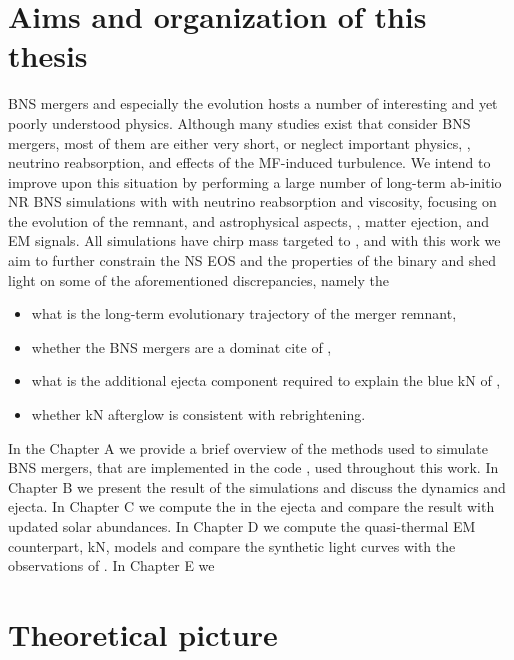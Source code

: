\section{Aims and organization of this thesis}

\ac{BNS} mergers and especially the \pmerg{} evolution hosts a number of interesting 
and yet poorly understood physics. Although many studies exist that consider \ac{BNS} mergers, 
most of them are either very short, or neglect important physics, \eg, neutrino reabsorption, 
and effects of the \ac{MF}-induced turbulence. 
%
We intend to improve upon this situation by performing a large number of long-term ab-initio 
\ac{NR} \ac{BNS} simulations with with neutrino reabsorption and viscosity, focusing on the 
\pmerg{} evolution of the remnant, and astrophysical aspects, \ie, matter ejection, 
\rproc{} \nuc{} and \ac{EM} signals. 
%
All simulations have chirp mass targeted to \GW{}, and with this work we aim to further 
constrain the \ac{NS} \ac{EOS} and the properties of the binary and shed light on 
some of the aforementioned discrepancies, namely the 
\begin{itemize}
    \item what is the long-term evolutionary trajectory of the merger remnant,
    \item whether the \ac{BNS} mergers are a dominat cite of \rproc{}, 
    \item what is the additional ejecta component required to explain the blue \ac{kN} of \AT{}, 
    \item whether \ac{kN} afterglow is consistent with \GRB{} rebrightening.
\end{itemize}

In the Chapter A we provide a brief overview of the methods used to simulate \ac{BNS} mergers, 
that are implemented in the code \wisky{}, used throughout this work.
In Chapter B we present the result of the simulations and discuss the dynamics and ejecta.
In Chapter C we compute the \rproc{} \nuc{} in the ejecta and compare the result with updated 
solar abundances.
In Chapter D we compute the quasi-thermal \ac{EM} counterpart, \ac{kN}, models and compare 
the synthetic light curves with the observations of \AT{}.
In Chapter E we 








\section{Theoretical picture}

